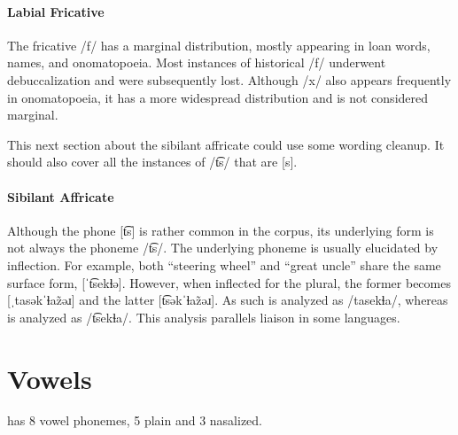 \paragraph{Labial Fricative}
The fricative /f/ has a marginal distribution, mostly appearing in loan words, names, and onomatopoeia. Most instances of historical /f/ underwent debuccalization and were subsequently lost. Although /x/ also appears frequently in onomatopoeia, it has a more widespread distribution and is not considered marginal.

\begin{kaobox}[frametitle=\sc todo:]
    This next section about the sibilant affricate could use some wording cleanup. It should also cover all the instances of /t͡s/ that are [s].
\end{kaobox}

\paragraph{Sibilant Affricate}
Although the phone [t͡s] is rather common in the corpus, its underlying form is not always the phoneme /t͡s/.  The underlying phoneme is usually elucidated by inflection. For example, both  “steering wheel” and  “great uncle” share the same surface form, [ˈt͡sekɬə]. However, when inflected for the plural, the former becomes [ˌtasəkˈɬaz̃əɹ] and the latter [t͡səkˈɬaz̃əɹ]. As such  is analyzed as /tasekɬa/, whereas  is analyzed as /t͡sekɬa/. This analysis parallels liaison in some languages.


\section{Vowels}
\langname{} has 8 vowel phonemes, 5 plain and 3 nasalized. 

